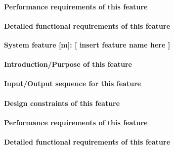 \documentclass[letterpaper, 10pt, draftclsnofoot, onecolumn]{IEEEtran}
\begin{document}
{{\paragraph[Performance requirements of this
feature]{\rmfamily\bfseries\color{black}
Performance requirements of this feature}

\paragraph[Detailed functional requirements of this
feature]{\rmfamily\bfseries\color{black}
Detailed functional requirements of this feature}


{\rmfamily\bfseries\color{black} System
feature [m]: [ insert feature name here ]}

\paragraph[\ Introduction/Purpose of this feature]{\rmfamily\bfseries\color{black}Introduction/Purpose of this feature}

\paragraph[Input/Output sequence for this
feature]{\rmfamily\bfseries\color{black}
Input/Output sequence for this feature}

\paragraph[Design constraints of this
feature]{\rmfamily\bfseries\color{black} Design
constraints of this feature}

\paragraph[Performance requirements of this
feature]{\rmfamily\bfseries\color{black}
Performance requirements of this feature}

\paragraph[Detailed functional requirements of this
feature]{\rmfamily\bfseries\color{black}
Detailed functional requirements of this feature}

}}
\end{document}
